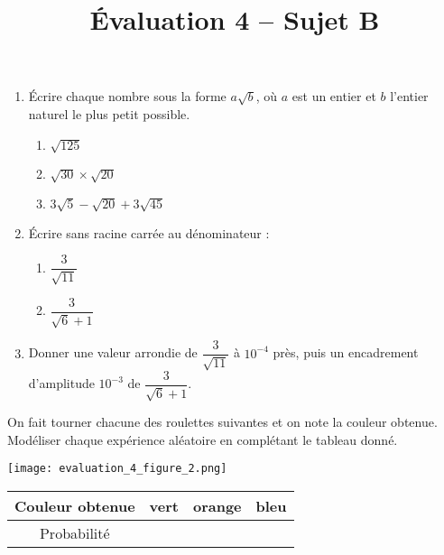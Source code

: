 \documentclass[a4paper,dvipsnames]{article}
\begin{document}
\title{Évaluation 4 -- Sujet B}
\author{}
\date{}

\maketitle{}

\pagestyle{empty}

\exo\vspace{-2mm} 
\begin{enumerate}
  \item Écrire chaque nombre sous la forme $a\sqrt{b}$, où $a$ est un entier et $b$ l'entier naturel le plus petit possible.

    \begin{multicols}{3}
      \begin{enumerate}
	\item $\sqrt{125}$
	\item $\sqrt{30}\times\sqrt{20}$
	\item $3\sqrt{5}-\sqrt{20}+3\sqrt{45}$
      \end{enumerate}
    \end{multicols}
  \item Écrire sans racine carrée au dénominateur :

    \begin{multicols}{2}
      \begin{enumerate}
	\item $\dfrac{3}{\sqrt{11}}$
	\item $\dfrac{3}{\sqrt{6}+1}$
      \end{enumerate} 
    \end{multicols}

  \item Donner une valeur arrondie de $\dfrac{3}{\sqrt{11}}$ à $10^{-4}$ près, puis un encadrement d'amplitude $10^{-3}$ de $\dfrac{3}{\sqrt{6}+1}$.
\end{enumerate}

\bigskip

\exo On fait tourner chacune des roulettes suivantes et on note la couleur obtenue. Modéliser chaque expérience aléatoire en complétant le tableau donné.

\begin{multicols}{2}
  \begin{center}
    \texttt{[image: evaluation\_4\_figure\_2.png]}
  \end{center}

  \begin{center}
    \vspace*{0.7cm}
    \hspace*{-3cm}\begin{tabular}{@{}cccc@{}}
      \toprule
      Couleur obtenue & vert & orange & bleu\\
      \midrule
      Probabilité & & & \vphantom{$\dfrac{1}{4}$}\\
      \bottomrule
    \end{tabular}
  \end{center}
\end{multicols}
\end{document}
